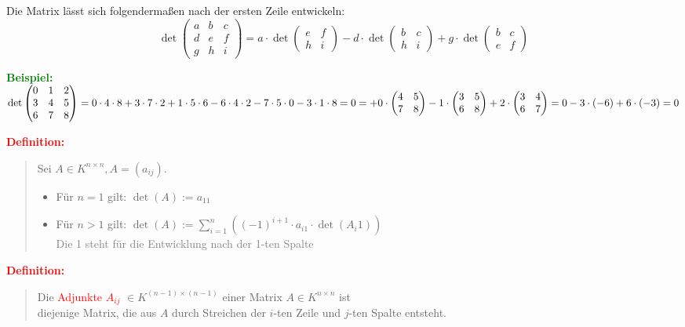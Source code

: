 \documentclass{article}
\newcommand{\red}[1]{\textcolor{red}{#1}}
\newcommand{\gray}[1]{\textcolor{gray}{#1}}
\newcommand{\green}[1]{\textcolor{green}{#1}}
\newcommand{\ex}{\green{\textbf{Beispiel: }}}
\newcommand{\de}[1]{\red{\textbf{Definition: }}\begin{quote}#1\end{quote}}
\begin{document}
Die Matrix lässt sich folgendermaßen nach der ersten Zeile entwickeln:
\[
\det \begin{pmatrix}
    a & b & c\\
    d & e & f\\
    g & h & i
\end{pmatrix} = a \cdot \det \begin{pmatrix}
    e & f\\
    h & i
\end{pmatrix} - d \cdot \det \begin{pmatrix}
    b & c\\
    h & i
\end{pmatrix} + g \cdot \det \begin{pmatrix}
    b & c\\
    e & f
\end{pmatrix}
\]

\ex $\det \begin{pmatrix}
    0 & 1 & 2\\
    3 & 4 & 5\\
    6 & 7 & 8
\end{pmatrix} = 0 \cdot 4 \cdot 8 + 3 \cdot 7 \cdot 2 + 1 \cdot 5 \cdot 6 - 6 \cdot 4 \cdot 2 - 7 \cdot 5 \cdot 0 - 3 \cdot 1 \cdot 8 = 0\\
\\
= + 0 \cdot \begin{pmatrix}
    4 & 5\\
    7 & 8
\end{pmatrix} - 1 \cdot \begin{pmatrix}
    3 & 5\\
    6 & 8
\end{pmatrix} + 2 \cdot \begin{pmatrix}
    3 & 4\\
    6 & 7
\end{pmatrix} = 0 - 3 \cdot (-6) + 6 \cdot (-3) = 0$

\de{
    Sei $A \in K^{n \times n}, A = (a_{ij})$.
    \begin{itemize}
        \item Für $n = 1$ gilt: $\det(A) := a_{11}$
        \item Für $n > 1$ gilt: $\det(A) := \sum_{i = 1}^{n}((-1)^{i+1} \cdot a_{i1} \cdot \det(A_i1))$\\
        \gray{Die 1 steht für die Entwicklung nach der 1-ten Spalte}
    \end{itemize}
}

\newpage
\de{
    Die \red{Adjunkte $A_{ij}$} $\in K^{(n-1) \times (n-1)}$ einer Matrix $A \in K^{n \times n}$ ist\\
    diejenige Matrix, die aus $A$ durch Streichen der $i$-ten Zeile und $j$-ten Spalte entsteht.
}
\end{document}
